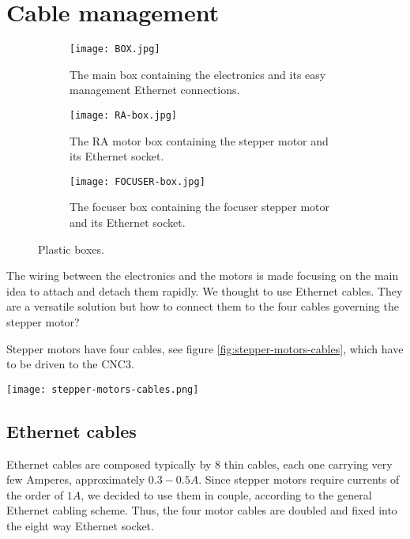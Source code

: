 \section{Cable management}
\label{sec:cable-menagement}
\begin{figure*}
    \centering
    \begin{subfigure}[t!]
        {0.3\textwidth}
        \centering
        \texttt{[image: BOX.jpg]}
        \caption{The main box containing the electronics and its easy management Ethernet connections.}
        \label{fig:box}
    \end{subfigure}
    \begin{subfigure}[t!]
        {0.3\textwidth}
        \centering
        \texttt{[image: RA-box.jpg]}
        \caption{The RA motor box containing the stepper motor and its Ethernet socket.}
        \label{fig:RA-box}
    \end{subfigure}
    \begin{subfigure}[t!]
        {0.3\textwidth}
        \centering
        \texttt{[image: FOCUSER-box.jpg]}
        \caption{The focuser box containing the focuser stepper motor and its Ethernet socket.}
        \label{fig:focuser-box}
    \end{subfigure}
    \caption{Plastic boxes.}
    \label{fig:plastic-boxes}
\end{figure*}
The wiring between the electronics and the motors is made focusing on the main idea to attach and detach them rapidly.
We thought to use Ethernet cables.
They are a versatile solution but how to connect them to the four cables governing the stepper motor?

Stepper motors have four cables, see figure \ref{fig:stepper-motors-cables}, which have to be driven to the CNC3.
\\
\begin{minipage}
    {0.5\textwidth}
    \centering
    \texttt{[image: stepper-motors-cables.png]}
    \label{fig:stepper-motors-cables}
\end{minipage}

\subsection{Ethernet cables}
Ethernet cables are composed typically by 8 thin cables, each one carrying very few Amperes, approximately \(0.3-0.5A\).
Since stepper motors require currents of the order of \(1A\), we decided to use them in couple, according to the general Ethernet cabling scheme.
Thus, the four motor cables are doubled and fixed into the eight way Ethernet socket.

